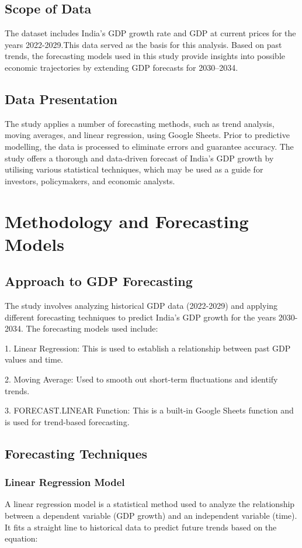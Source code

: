\documentclass{article}
\begin{document}
\subsection{Scope of Data}
The dataset includes India's GDP growth rate and GDP at current prices for the years 2022-2029.This data served as the basis for this analysis. Based on past trends, the forecasting models used in this study provide insights into possible economic trajectories by extending GDP forecasts for 2030–2034.

\subsection{Data Presentation}
The study applies a number of forecasting methods, such as trend analysis, moving averages, and linear regression, using Google Sheets.  Prior to predictive modelling, the data is processed to eliminate errors and guarantee accuracy.  The study offers a thorough and data-driven forecast of India's GDP growth by utilising various statistical techniques, which may be used as a guide for investors, policymakers, and economic analysts.

\section{Methodology and Forecasting Models}
\subsection{Approach to GDP Forecasting}
The study involves analyzing historical GDP data (2022-2029) and applying different forecasting techniques to predict India's GDP growth for the years 2030-2034. The forecasting models used include:

1. Linear Regression: This is used to establish a relationship between past GDP values and time.


2. Moving Average: Used to smooth out short-term fluctuations and identify trends.


3. FORECAST.LINEAR Function: This is a built-in Google Sheets function and is used for trend-based forecasting.

\subsection{Forecasting Techniques}
\subsubsection{Linear Regression Model}
A linear regression model is a statistical method used to analyze the relationship between a dependent variable (GDP growth) and an independent variable (time). It fits a straight line to historical data to predict future trends based on the equation:
\end{document}

